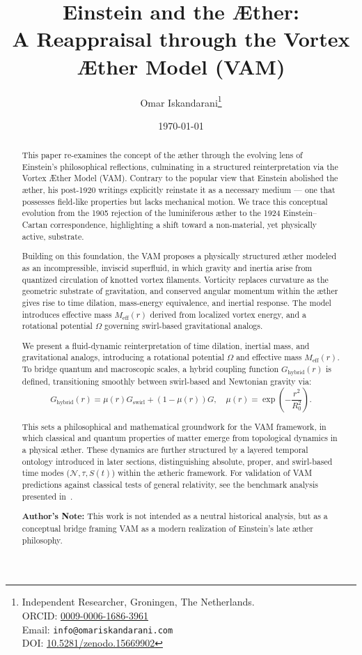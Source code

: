 \documentclass[a4paper,12pt]{article}
\title{Einstein and the Æther:\\A Reappraisal through the Vortex Æther Model (VAM)}
\author{
    Omar Iskandarani\thanks{
        Independent Researcher, Groningen, The Netherlands.\\
        ORCID: \href{https://orcid.org/0009-0006-1686-3961}{0009-0006-1686-3961}\\
        Email: \texttt{info@omariskandarani.com}\\
        DOI: \href{https://doi.org/10.5281/zenodo.15669902}{10.5281/zenodo.15669902}
    }
}
\date{\today}
\begin{document}
\maketitle

\begin{abstract}

    This paper re-examines the concept of the æther through the evolving lens of Einstein’s philosophical reflections, culminating in a structured reinterpretation via the Vortex Æther Model (VAM). Contrary to the popular view that Einstein abolished the æther, his post-1920 writings explicitly reinstate it as a necessary medium — one that possesses field-like properties but lacks mechanical motion. We trace this conceptual evolution from the 1905 rejection of the luminiferous æther to the 1924 Einstein–Cartan correspondence, highlighting a shift toward a non-material, yet physically active, substrate.

    Building on this foundation, the VAM proposes a physically structured æther modeled as an incompressible, inviscid superfluid, in which gravity and inertia arise from quantized circulation of knotted vortex filaments. Vorticity replaces curvature as the geometric substrate of gravitation, and conserved angular momentum within the æther gives rise to time dilation, mass-energy equivalence, and inertial response. The model introduces effective mass \( M_{\text{eff}}(r) \) derived from localized vortex energy, and a rotational potential \( \Omega \) governing swirl-based gravitational analogs.

    We present a fluid-dynamic reinterpretation of time dilation, inertial mass, and gravitational analogs, introducing a rotational potential \( \Omega \) and effective mass \( M_{\text{eff}}(r) \). To bridge quantum and macroscopic scales, a hybrid coupling function \( G_{\text{hybrid}}(r) \) is defined, transitioning smoothly between swirl-based and Newtonian gravity via:
    \[
        G_{\text{hybrid}}(r) = \mu(r) G_{\text{swirl}} + (1 - \mu(r)) G, \quad \mu(r) = \exp\left(-\frac{r^2}{R_0^2}\right).
    \]

    This sets a philosophical and mathematical groundwork for the VAM framework, in which classical and quantum properties of matter emerge from topological dynamics in a physical æther. These dynamics are further structured by a layered temporal ontology introduced in later sections, distinguishing absolute, proper, and swirl-based time modes (\( \mathcal{N}, \tau, S(t) \)) within the ætheric framework.
    For validation of VAM predictions against classical tests of general relativity, see the benchmark analysis presented in~\cite{iskandarani2025benchmark}.

    \textbf{Author’s Note:} This work is not intended as a neutral historical analysis, but as a conceptual bridge framing VAM as a modern realization of Einstein’s late æther philosophy.



\end{abstract}
\end{document}
